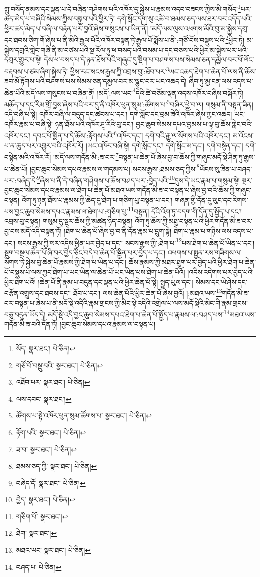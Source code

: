 ཀླུ་བསོད་ནམས་དང་ལྡན་པ་དེ་བཞིན་གཤེགས་པའི་འཁོར་དུ་སྐྱེས་པ་རྣམས་འདབ་བཟངས་ཀྱིས་མི་གསོད་\footnote{སོད་  སྣར་ཐང་།  པེ་ཅིན། }པར་ཚད་མེད་པ་བཞིའི་སེམས་ཀྱིས་བསྐྱབ་པའི་ཕྱིར་ཏེ། དགེ་སློང་དག་སུ་འཚེ་བ་ཐམས་ཅད་ལས་ཐར་བར་འདོད་པའི་ཕྱིར་ཚད་མེད་པ་བཞི་ལ་བརྟེན་པར་བྱའོ་ཞེས་གསུངས་པ་ཡིན་ནོ། །མདོ་ལས་ལུས་འཕགས་མོའི་བུ་མ་སྐྱེས་དགྲ་དང་ཐབས་ཅིག་གོ་ཞེས་པ་ནི་མིའི་རྒྱལ་པོའི་འཁོར་བསྟན་ཏེ་རྒྱལ་པོ་སྨོས་པ་ནི་:གཙོ་བོས་བསྡུས་པའི་\footnote{གཙོ་བོ་བསྡུ་བའི་  སྣར་ཐང་།  པེ་ཅིན། }ཕྱིར་ཏེ། མ་སྐྱེས་དགྲའི་གླེང་གཞི་ནི་མ་བཙས་པའི་སྔ་རོལ་ཏུ་ཕ་བསད་པའི་བསམ་པ་དང་བཅས་པའི་ཕྱིར་མ་སྐྱེས་པར་ཕའི་དགྲར་གྱུར་པ་སྟེ། དེས་ཕ་བསད་པ་དེ་ཉན་ཐོས་པའི་གཞུང་དུ་སྡིག་པ་བཤགས་པས་སེམས་ཅན་དམྱལ་བར་ཕོ་ལོང་བརྡབས་པ་ཙམ་ཞིག་སྐྱེས་ཏེ། ཕྱིས་རང་སངས་རྒྱས་ཀྱི་འབྲས་བུ་:ཐོབ་པར་\footnote{འཐོབ་པར་  སྣར་ཐང་།  པེ་ཅིན། }ཡང་འཆད་ཐེག་པ་ཆེན་པོ་ལས་ནི་ཆོས་ཟབ་མོ་རྟོགས་པའི་བཤགས་པས་སེམས་ཅན་དམྱལ་བར་མ་ལྷུང་བར་ཡང་འཆད་དེ། ཞིབ་ཏུ་མྱ་ངན་ལས་འདས་པ་ཆེན་པོའི་མདོ་ལས་གསུངས་པ་བཞིན་ནོ། །མདོ་:ལས་ཡང་\footnote{ལས་དབང་  སྣར་ཐང་། }དེའི་ཚེ་བཅོམ་ལྡན་འདས་འཁོར་བཞིས་བསྐོར་ཏེ། མཆོད་པ་དང་རིམ་གྲོ་བྱས་ཞེས་པའི་བར་དུ་ནི་འཁོར་ཕུན་སུམ་:ཚོགས་པ་\footnote{ཚོགས་པ་སྟེ་འཁོར་ཕུན་སུམ་ཚོགས་པ་  སྣར་ཐང་།  པེ་ཅིན། }བཞིར་ཕྱེ་བ་ལ། གསུམ་ནི་བསྟན་ཟིན། འདི་བཞི་པ་སྟེ། འཁོར་བཞི་ལ་བདུད་དང་ཚངས་པ་དང་། དགེ་སློང་དང་བྲམ་ཟེའི་འཁོར་ཞེས་ཀྱང་འཆད། ཡང་འཁོར་རྣམ་པ་བཞི་སྟེ། ཉན་ཐོས་པའི་འཁོར་ཤཱ་རིའི་བུ་དང་། བྱང་ཆུབ་སེམས་དཔའ་བྱམས་པ་ལྟ་བུ་ཆོས་གླེང་བའི་འཁོར་དང་། དབང་པོ་སྨིན་པ་དེ་ཆོས་:རྟོགས་པའི་\footnote{རྟོག་པའི་  སྣར་ཐང་།  པེ་ཅིན། }འཁོར་དང་། དགེ་བའི་རྒྱུ་ལ་སོགས་པའི་འཁོར་དང་། མ་འོངས་པ་ན་ཆུད་པར་འགྱུར་བའི་འཁོར་རོ། །ཡང་འཁོར་བཞི་སྟེ། དགེ་སློང་དང་། དགེ་སློང་མ་དང་། དགེ་བསྙེན་དང་། དགེ་བསྙེན་མའི་འཁོར་རོ། །མདོ་ལས་གདོན་མི་:ཟ་བར་\footnote{ཟ་བ་  སྣར་ཐང་།  པེ་ཅིན། }བསྟན་པ་ཆེན་པོ་ཞེས་བྱ་བ་ཆོས་ཀྱི་གཞུང་མདོ་སྡེ་ཤིན་ཏུ་རྒྱས་པ་ཆེན་པོ། །བྱང་ཆུབ་སེམས་དཔའ་རྣམས་ལ་གདམས་པ། སངས་རྒྱས་:ཐམས་ཅད་ཀྱིས་\footnote{ཐམས་ཅད་ཀྱི་  སྣར་ཐང་།  པེ་ཅིན། }ཡོངས་སུ་ཟིན་པ་བཤད་པར་:བཞེད་དེ་\footnote{བཞེད་དོ་  སྣར་ཐང་།  པེ་ཅིན། }ཞེས་པ་ནི་དེ་བཞིན་གཤེགས་པ་ཆོས་བཤད་པར་:བྱེད་པའི་\footnote{བྱེད་  སྣར་ཐང་།  པེ་ཅིན། }དུས་དེ་ཡང་རྣམ་པ་གསུམ་སྟེ། སྔར་བྱང་ཆུབ་སེམས་དཔའ་རྣམས་ལ་ཐེག་པ་ཆེན་པོ་མཐའ་ཡས་གདོན་མི་ཟ་བ་བསྟན་པ་ཞེས་བྱ་བའི་ཆོས་ཀྱི་གཞུང་བསྟན། འོག་ཏུ་ཉན་ཐོས་པ་རྣམས་ཀྱི་ཆེད་དུ་ཐེག་པ་གཅིག་པུ་བསྟན་པ་དང་། གཞན་གྱི་དོན་དུ་ལུང་དང་རིགས་པས་བྱང་ཆུབ་སེམས་དཔའ་རྣམས་ལ་ཐེག་པ་:གཅིག་པུ་\footnote{གཅིག་པོ་  སྣར་ཐང་། }བསྟན། དེའི་འོག་ཏུ་བདག་གི་དོན་དུ་སྤྱོད་པ་དང་། འབྲས་བུ་བསྟན། གསུམ་དུ་སྔར་ཆོས་ཀྱི་མཚན་ཉིད་བསྟན། འོག་ཏུ་ཆོས་ཀྱི་མཐུ་བསྟན་པའི་ཕྱིར་གདོན་མི་ཟ་བར་བྱ་བས་མདོ་འདི་བསྟན་ཏོ། །ཐེག་པ་ཆེན་པོ་ཞེས་བྱ་བ་ནི་དོན་རྣམ་པ་དྲུག་སྟེ། ཐེག་པ་རྣམ་པ་གཉིས་ལས་འདས་པ་དང་། སངས་རྒྱས་ཀྱི་སར་འདིས་ཕྱིན་པར་བྱེད་པ་དང་། སངས་རྒྱས་ཀྱི་:ཐེག་པ་\footnote{ཐེག་  སྣར་ཐང་། }པས་ཐེག་པ་ཆེན་པོ་ཡིན་པ་དང་། སྡུག་བསྔལ་ཆེན་པོ་ཞི་བར་བྱེད་ཅིང་བདེ་བ་ཆེན་པོ་སྦྱིན་པར་བྱེད་པ་དང་། འཕགས་པ་སྤྱན་རས་གཟིགས་ལ་སོགས་ཏེ་སྐྱེས་བུ་ཆེན་པོ་རྣམས་ཀྱི་ཐེག་པ་ཡིན་པ་དང་། ཆོས་རྣམས་ཀྱི་མཐར་ཐུག་པར་བྱེད་པའི་ཕྱིར་ཐེག་པ་ཆེན་པོ་བསྡུས་པ་ལས་ཀྱང་ཐེག་པ་ཡང་ཡིན་ལ་ཆེན་པོ་ཡང་ཡིན་པས་ཐེག་པ་ཆེན་པོའོ། །འདིས་འདེགས་པར་བྱེད་པའི་ཕྱིར་ཐེག་པའོ། །ཆེན་པོ་ནི་རྣམ་པ་བདུན་དང་ལྡན་པའི་ཕྱིར་ཆེན་པོ་སྟེ། སྤྱད་ཡུལ་དང་། སེམས་དང་ཡེ་ཤེས་དང་བརྩོན་འགྲུས་དང་ཐབས་དང་། ཐོབ་པ་དང་། ལས་ཆེན་པོའི་ཕྱིར་ཆེན་པོ་ཞེས་བྱའོ། །:མཐའ་ཡས་\footnote{མཐའ་ཡང་  སྣར་ཐང་།  པེ་ཅིན། }གདོན་མི་ཟ་བར་བསྟན་པ་ཞེས་པ་ནི་མདོ་སྡེ་འདིའི་རྣམ་གྲངས་ཀྱི་མིང་སྟེ་འདིའི་འགྲེལ་པ་ལས་མདོ་སྡེའི་མིང་གི་རྣམ་གྲངས་བཅུ་བདུན་ཡོད་དེ། མདོ་སྡེ་འདི་བྱང་ཆུབ་སེམས་དཔའ་ཐེག་པ་ཆེན་པོ་སྤྱོད་པ་རྣམས་ལ་:བཤད་པས་\footnote{བཤད་པ་  པེ་ཅིན། }མཐའ་ཡས་གདོན་མི་ཟ་བའི་དོན་ཏོ། །བྱང་ཆུབ་སེམས་དཔའ་རྣམས་ལ་བསྟན་པ། 